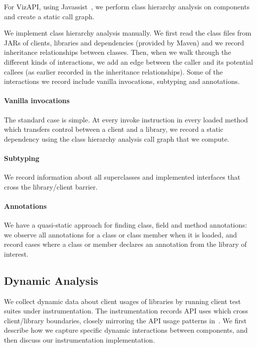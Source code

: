 For VizAPI, using Javassist~\cite{chiba00:_load_struc_reflec_java}, we 
perform class hierarchy analysis on components and create a static call
graph. 

We implement class hierarchy analysis manually. We first read the class files from JARs of clients, libraries and dependencies (provided by Maven) and we record
inheritance relationships between classes. Then, when we walk through the different kinds of interactions,
 we add an edge between the caller and its potential callees
(as earlier recorded in the inheritance relationships). 
Some of the interactions we record include vanilla invocations, subtyping and annotations.

\paragraph{Vanilla invocations}
The standard case is simple. At every invoke instruction in every
loaded method which transfers control between a client and a
library, we record a static dependency using the class hierarchy
analysis call graph that we compute.

\paragraph{Subtyping}
We record information about all superclasses and implemented interfaces that cross the library/client barrier. 

\paragraph{Annotations}
We have a quasi-static approach for finding class, field and method annotations:
we observe all annotations for a class or class member when it is loaded, and
record cases where a class or member declares an annotation from the library of interest.

\subsection{Dynamic Analysis}
\label{subsec:dynamic}
We collect dynamic data about client usages of libraries by running client
test suites under instrumentation. The instrumentation records API
uses which cross client/library boundaries, closely mirroring the API
usage patterns
in~\cite{venkatanarayanan22:_study_lever_api_usage_patter}. We first
describe how we capture specific dynamic interactions between components, and
then discuss our instrumentation implementation.

